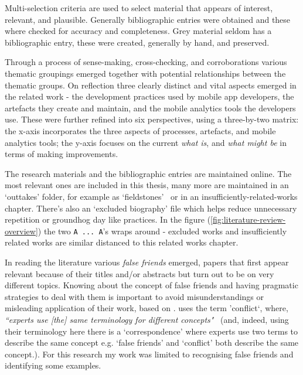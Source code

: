 Multi-selection criteria are used to select material that appears of interest, relevant, and plausible. Generally bibliographic entries were obtained and these where checked for accuracy and completeness. Grey material seldom has a bibliographic entry, these were created, generally by hand, and preserved.

Through a process of sense-making, cross-checking, and corroborations various thematic groupings emerged together with potential relationships between the thematic groups. On reflection three clearly distinct and vital aspects emerged in the related work - the development practices used by mobile app developers, the artefacts they create and maintain, and the mobile analytics tools the developers use. These were further refined into six perspectives, using a three-by-two matrix: the x-axis incorporates the three aspects of processes, artefacts, and mobile analytics tools; the y-axis focuses on the current \emph{what is}, and \emph{what might be} in terms of making improvements.

The research materials and the bibliographic entries are maintained online. The most relevant ones are included in this thesis, many more are maintained in an `outtakes' folder, for example as `fieldstones'~ or in an insufficiently-related-works chapter. There's also an `excluded biography' file which helps reduce unnecessary repetition or groundhog day like practices. In the figure (\ref{fig:literature-review-overview}) the two \texttt{A ... A}'s wraps around - excluded works and insufficiently related works are similar distanced to this related works chapter.

In reading the literature various \textit{false friends} emerged, papers that first appear relevant because of their titles and/or abstracts but turn out to be on very different topics. 
Knowing about the concept of false friends and having pragmatic strategies to deal with them is important to avoid misunderstandings or misleading application of their work, 
based on \cite[p. 1833]{chamizodominguez2002_false_friends_their_origins_and_semantics_in_some_languages}. 
\textcite{shaw1989_comparing_conceptual_structures__consensus_conflict_correspondence_and_contrast} uses the term 'conflict`, where, \emph{``experts use [the] same terminology for different concepts"}~\cite[p. 3]{shaw1989_comparing_conceptual_structures__consensus_conflict_correspondence_and_contrast} (and, indeed, using their terminology here there is a `correspondence' where experts use two terms to describe the same concept e.g. `false friends' and `conflict' both describe the same concept.). For this research my work was limited to recognising false friends and identifying some examples. 

